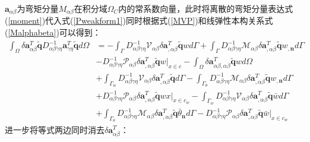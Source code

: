 $\pmb{a}_{\alpha\beta}$为弯矩分量$M_{\alpha\beta}$在积分域$\Omega_C$内的常系数向量，此时将离散的弯矩分量表达式(\ref{moment})代入式(\ref{Pweakform1})同时根据式(\ref{MVP})和线弹性本构关系式(\ref{Malphabeta})可以得到：
\begin{equation}
\begin{split}
    \int_{\Omega}\delta\pmb{a}_{\alpha\beta}^T\tilde{\pmb{q}}D^{-1}_{\alpha\beta\gamma\eta}\pmb{a}_{\gamma\eta}^T\tilde{\pmb{q}}d\Omega&=
    -\int_{\Gamma}D_{\alpha\beta\gamma\eta}^{-1}\mathcal{V}_{\alpha\beta}\delta\pmb{a}_{,\alpha\beta}^T\tilde{\pmb{q}}wd\Gamma
    +\int_{\Gamma}D_{\alpha\beta\gamma\eta}^{-1}\mathcal{M}_{\alpha\beta}\delta\pmb{a}_{,\alpha\beta}^T\tilde{\pmb{q}}w_{,\pmb{n}}d\Gamma\\
    &-D_{\alpha\beta\gamma\eta}^{-1}\mathcal{P}_{\alpha\beta}\delta\pmb{a}_{,\alpha\beta}^T\tilde{\pmb{q}}w\vert_{x\in c}
    -\int_{\Omega}\delta\pmb{a}_{\alpha\beta,\alpha\beta}^T\tilde{\pmb{q}}wd\Omega\\
    &+\int_{\Gamma_w}D_{\alpha\beta\gamma\eta}^{-1}\mathcal{V}_{\alpha\beta}\delta\pmb{a}_{,\alpha\beta}^T\tilde{\pmb{q}}d\Gamma
    -\int_{\Gamma_{\theta}}D_{\alpha\beta\gamma\eta}^{-1}\mathcal{M}_{\alpha\beta}\delta\pmb{a}_{,\alpha\beta}^T\tilde{\pmb{q}}w_{,\pmb{n}}d\Gamma\\
    &+D_{\alpha\beta\gamma\eta}^{-1}\mathcal{P}_{\alpha\beta}\delta\pmb{a}_{,\alpha\beta}^T\tilde{\pmb{q}}wx\vert_{x\in{c_w}}
    -\int_{\Gamma_w}D_{\alpha\beta\gamma\eta}^{-1}\mathcal{V}_{\alpha\beta}\delta\pmb{a}_{,\alpha\beta}^T\tilde{\pmb{q}}\bar{w}d\Gamma\\
    &+\int_{\Gamma_{\theta}}D_{\alpha\beta\gamma\eta}^{-1}\mathcal{M}_{\alpha\beta}\delta\pmb{a}_{,\alpha\beta}^T\tilde{\pmb{q}}\bar{\theta}_{\pmb{n}}d\Gamma
    -D_{\alpha\beta\gamma\eta}^{-1}\mathcal{P}_{\alpha\beta}\delta\pmb{a}_{,\alpha\beta}^T\tilde{\pmb{q}}\bar{w}\vert_{x\in{c_w}}
\end{split}
\end{equation}
进一步将等式两边同时消去$\delta\pmb{a}^T_{\alpha\beta}$：
